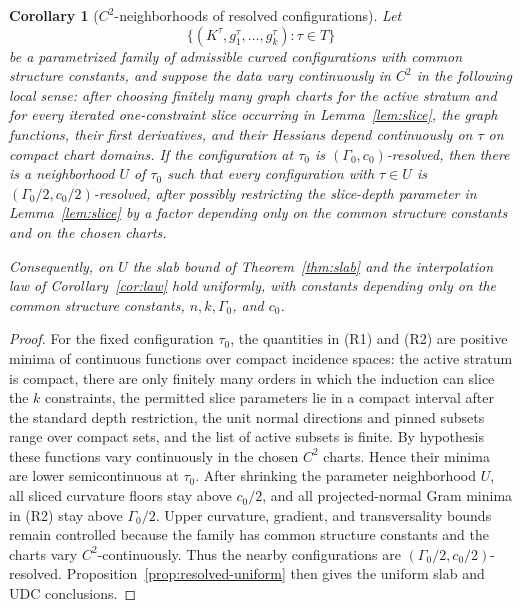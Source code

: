 \documentclass[11pt]{article}
\newtheorem{corollary}[theorem]{Corollary}
\begin{document}
\begin{corollary}[\(C^2\)-neighborhoods of resolved configurations]
\label{cor:resolved-neighborhood}
Let
\[
  \{(K^\tau,g^\tau_1,\ldots,g^\tau_k):\tau\in T\}
\]
be a parametrized family of admissible curved configurations with common
structure constants, and suppose the data vary continuously in \(C^2\) in the
following local sense: after choosing finitely many graph charts for the active
stratum and for every iterated one-constraint slice occurring in
Lemma~\ref{lem:slice}, the graph functions, their first derivatives, and their
Hessians depend continuously on \(\tau\) on compact chart domains.  If the
configuration at \(\tau_0\) is \((\Gamma_0,c_0)\)-resolved, then there is a
neighborhood \(U\) of \(\tau_0\) such that every configuration with
\(\tau\in U\) is \((\Gamma_0/2,c_0/2)\)-resolved, after possibly restricting
the slice-depth parameter in Lemma~\ref{lem:slice} by a factor depending only
on the common structure constants and on the chosen charts.

Consequently, on \(U\) the slab bound of Theorem~\ref{thm:slab} and the
interpolation law of Corollary~\ref{cor:law} hold uniformly, with constants
depending only on the common structure constants, \(n,k,\Gamma_0\), and \(c_0\).
\end{corollary}

\begin{proof}
For the fixed configuration \(\tau_0\), the quantities in (R1) and (R2) are
positive minima of continuous functions over compact incidence spaces: the
active stratum is compact, there are only finitely many orders in which the
induction can slice the \(k\) constraints, the permitted slice parameters lie
in a compact interval after the standard depth restriction, the unit normal
directions and pinned subsets range over compact sets, and the list of active
subsets is finite.  By hypothesis these functions vary continuously in the
chosen \(C^2\) charts.  Hence their minima are lower semicontinuous at
\(\tau_0\).  After shrinking the parameter neighborhood \(U\), all sliced
curvature floors stay above \(c_0/2\), and all projected-normal Gram minima in
(R2) stay above \(\Gamma_0/2\).  Upper curvature, gradient, and transversality
bounds remain controlled because the family has common structure constants and
the charts vary \(C^2\)-continuously.  Thus the nearby configurations are
\((\Gamma_0/2,c_0/2)\)-resolved.  Proposition~\ref{prop:resolved-uniform}
then gives the uniform slab and UDC conclusions.
\end{proof}
\end{document}
